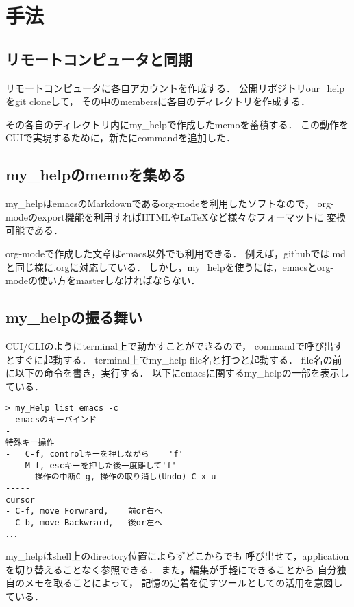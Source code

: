 \documentclass[a4j,twocolumn,uplatex]{jsarticle}
\begin{document}
\section{手法}
\subsection{リモートコンピュータと同期}
\label{sec-2-1}
リモートコンピュータに各自アカウントを作成する．
公開リポジトリour\_helpをgit cloneして，
その中のmembersに各自のディレクトリを作成する．                                                                  

その各自のディレクトリ内にmy\_helpで作成したmemoを蓄積する．                                          
この動作をCUIで実現するために，新たにcommandを追加した．

\subsection{my\_helpのmemoを集める}
\label{sec-2-2}
my\_helpはemacsのMarkdownであるorg-modeを利用したソフトなので，
org-modeのexport機能を利用すればHTMLやLaTeXなど様々なフォーマットに
変換可能である\cite{org-mode}．

org-modeで作成した文章はemacs以外でも利用できる．
例えば，githubでは.mdと同じ様に.orgに対応している．
しかし，my\_helpを使うには，emacsとorg-modeの使い方をmasterしなければならない．

\subsection{my\_helpの振る舞い}
\label{sec-2-3}
CUI/CLIのようにterminal上で動かすことができるので，
commandで呼び出すとすぐに起動する．
terminal上でmy\_help file名と打つと起動する．
file名の前に以下の命令を書き，実行する．
以下にemacsに関するmy\_helpの一部を表示している．
{\small\setlength\baselineskip{10pt}	%
\begin{verbatim}
> my_Help list emacs -c
- emacsのキーバインド
- 
特殊キー操作
-   C-f, controlキーを押しながら    'f'
-   M-f, escキーを押した後一度離して'f'
-     操作の中断C-g, 操作の取り消し(Undo) C-x u
-----
cursor
- C-f, move Forwrard,    前or右へ
- C-b, move Backwrard,   後or左へ
．．．
\end{verbatim}
}

my\_helpはshell上のdirectory位置によらずどこからでも
呼び出せて，applicationを切り替えることなく参照できる．
また，編集が手軽にできることから
自分独自のメモを取ることによって，
記憶の定着を促すツールとしての活用を意図している．
\end{document}
